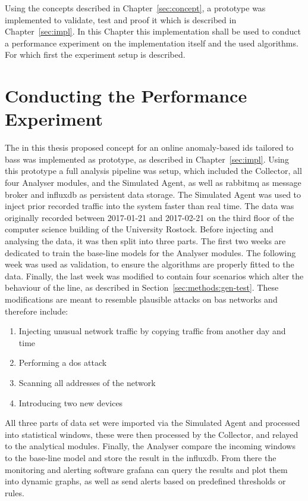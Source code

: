 Using the concepts described in Chapter~\ref{sec:concept}, a prototype was implemented to validate, test and proof it which is described in Chapter~\ref{sec:impl}.
In this Chapter this implementation shall be used to conduct a performance experiment on the implementation itself and the used algorithms.
For which first the experiment setup is described.

\section{Conducting the Performance Experiment}
\label{sec:results:experiment}

The in this thesis proposed concept for an online anomaly-based \gls{ids} tailored to \glspl{bas} was implemented as prototype, as described in Chapter~\ref{sec:impl}.
Using this prototype a full analysis pipeline was setup, which included the Collector, all four Analyser modules, and the Simulated Agent, as well as \gls{rabbitmq} as message broker and \gls{influxdb} as persistent data storage.
The Simulated Agent was used to inject prior recorded traffic into the system faster than real time.
The data was originally recorded between 2017-01-21 and 2017-02-21 on the third floor of the computer science building of the University Rostock.
Before injecting and analysing the data, it was then split into three parts. The first two weeks are dedicated to train the base-line models for the Analyser modules. The following week was used as validation, to ensure the algorithms are properly fitted to the data. Finally, the last week was modified to contain four scenarios which alter the behaviour of the line, as described in Section~\ref{sec:methods:gen-test}.
\newpage
These modifications are meant to resemble plausible attacks on \gls{bas} networks and therefore include:

\begin{enumerate}
	\item Injecting unusual network traffic by copying traffic from another day and time
	\item Performing a \gls{dos} attack
	\item Scanning all addresses of the network
	\item Introducing two new devices
\end{enumerate}

All three parts of data set were imported via the Simulated Agent and processed into statistical windows, these were then processed by the Collector, and relayed to the analytical modules. Finally, the Analyser compare the incoming windows to the base-line model and store the result in the \gls{influxdb}. From there the monitoring and alerting software \gls{grafana} can query the results and plot them into dynamic graphs, as well as send alerts based on predefined thresholds or rules.

